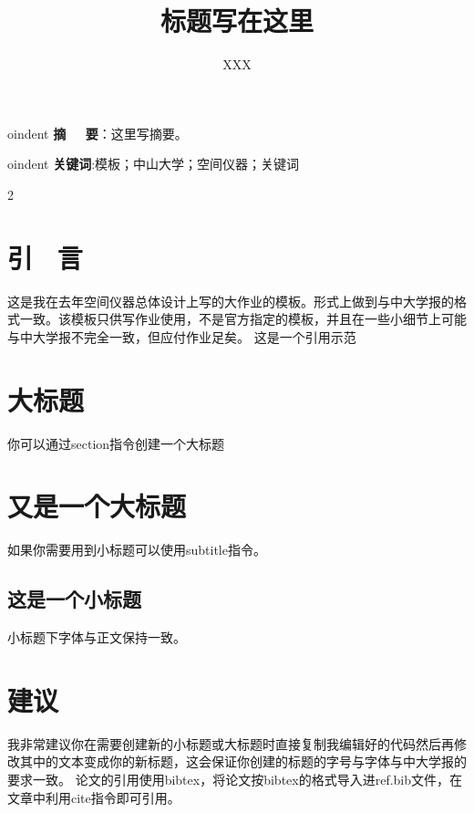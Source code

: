 \documentclass{article}
\title{\zihao{2}\songti \textbf{标题写在这里}}
\author{\zihao{-4}\kaishu XXX}
\affil{\zihao{5}\kaishu 中山大学物理与天文学院，广东 \ 珠海519082}
\date{}
\begin{document}
\maketitle
\thispagestyle{mystyle}

oindent
\songti \textbf{摘 \ \ 要}：这里写摘要。


oindent
\textbf{关键词}:模板；中山大学；空间仪器；关键词
\setlength\columnsep{0.8cm} %
\begin{multicols}{2} %
\section{\kaishu 引 \ 言}
\songti 这是我在去年空间仪器总体设计上写的大作业的模板。形式上做到与中大学报的格式一致。该模板只供写作业使用，不是官方指定的模板，并且在一些小细节上可能与中大学报不完全一致，但应付作业足矣。 这是一个引用示范\cite{1998Gravitational}
\section{\kaishu 大标题}
你可以通过section指令创建一个大标题
\section{\kaishu 又是一个大标题}
如果你需要用到小标题可以使用subtitle指令。
\subsection{\songti 这是一个小标题}
小标题下字体与正文保持一致。
\section{\kaishu 建议}
我非常建议你在需要创建新的小标题或大标题时直接复制我编辑好的代码然后再修改其中的文本变成你的新标题，这会保证你创建的标题的字号与字体与中大学报的要求一致。
论文的引用使用bibtex，将论文按bibtex的格式导入进ref.bib文件，在文章中利用cite指令即可引用。
\end{multicols}

\end{document}
